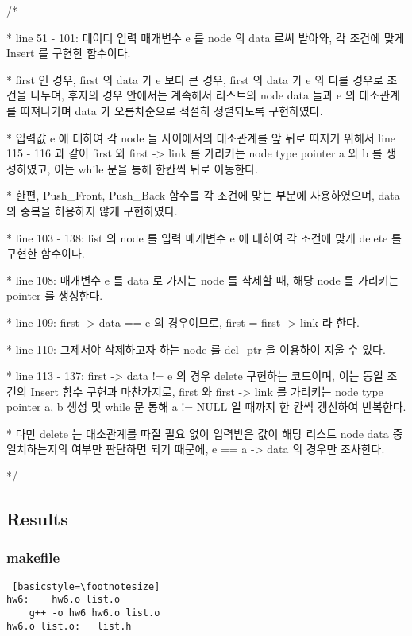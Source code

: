 \documentclass[twoside,twocolumn]{article}
\newenvironment{itemizeReduced}{
\begin{list}{\labelitemi}{\leftmargin=1em}
\setlength{\itemsep}{1pt}
\setlength{\parskip}{0pt}
\setlength{\parsep}{0pt}}{\end{list}
}
\begin{document}
\begin{itemizeReduced}
    \item[/*] 
    \item[*] line 51 - 101: 데이터 입력 매개변수 e 를 node 의 data 로써 받아와, 각 조건에 맞게 Insert 를 구현한 함수이다. 
    \item[*] first 인 경우, first 의 data 가 e 보다 큰 경우, first 의 data 가 e 와 다를 경우로 조건을 나누며, 후자의 경우 안에서는 계속해서 리스트의 node data 들과 e 의 대소관계를 따져나가며 data 가 오름차순으로 적절히 정렬되도록 구현하였다. 
    \item[*] 입력값 e 에 대하여 각 node 들 사이에서의 대소관계를 앞 뒤로 따지기 위해서 line 115 - 116 과 같이 first 와 first -> link 를 가리키는 node type pointer a 와 b 를 생성하였고, 이는 while 문을 통해 한칸씩 뒤로 이동한다.
    \item[*] 한편, Push\_Front, Push\_Back 함수를 각 조건에 맞는 부분에 사용하였으며, data 의 중복을 허용하지 않게 구현하였다.
    \item[*] line 103 - 138: list 의 node 를 입력 매개변수 e 에 대하여 각 조건에 맞게 delete 를 구현한 함수이다. 
    \item[*] line 108: 매개변수 e 를 data 로 가지는 node 를 삭제할 때, 해당 node 를 가리키는 pointer 를 생성한다.
    \item[*] line 109: first -> data == e 의 경우이므로, first = first -> link 라 한다.
    \item[*] line 110: 그제서야 삭제하고자 하는 node 를 del\_ptr 을 이용하여 지울 수 있다.
    \item[*] line 113 - 137: first -> data != e 의 경우 delete 구현하는 코드이며, 이는 동일 조건의 Insert 함수 구현과 마찬가지로, first 와 first -> link 를 가리키는 node type pointer a, b 생성 및 while 문 통해 a != NULL 일 때까지 한 칸씩 갱신하여 반복한다. 
    \item[*] 다만 delete 는 대소관계를 따질 필요 없이 입력받은 값이 해당 리스트 node data 중 일치하는지의 여부만 판단하면 되기 때문에, e == a -> data 의 경우만 조사한다.
\end{itemizeReduced}
*/


\newpage

\subsection{Results}
\subsubsection{makefile}
\begin{lstlisting} [basicstyle=\footnotesize]
hw6:	hw6.o list.o
	g++ -o hw6 hw6.o list.o
hw6.o list.o:	list.h
\end{lstlisting}
\end{document}
